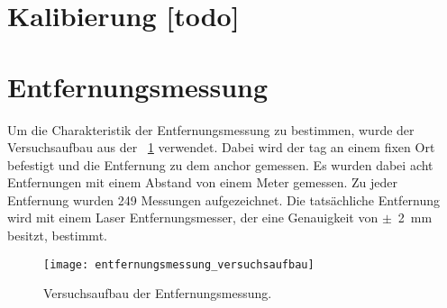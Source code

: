 \section{Kalibierung [todo]}


\begin{comment}
--------------------------------------------------------------------------------
- Mit welchen Einstellungen kommt man auf die Entfernungsmessung?
- Streuung?
- LOS/NLOS {Holz, Bücher, Menschlicher Körper}
	- Welcher Fehler ergibt zwischen LOS/NLOS?
- Wie verändert sich die Genauigkeit der Entfernungsmessung bei einer direkten Sichtverbindung (engl. Line--of--sight (LOS)) und indirekten Sichtverbindung (engl. Non--line--of--sight (NLOS))?
- isaacs2009optimal - Optimal sensor placement for time difference of arrival localization
- Diagramme
	- \cite{kurth2003experimental}
		- Fig. 2: Sample PDFs showing the true ranges associated with 20, 30, and 50 ft measured ranges. (X: true range, Y:count)
		- Fig. 3: The mean true distances to RF tags vs. measured distances (X:measured range, Y: true range)
		- Fig. 4: The variance in true distances to RF tags vs. measured distances (X:measured range (ft), Y: variance (ft^2))
	
- https://matheguru.com/stochastik/standardfehler.html
- https://de.wikipedia.org/wiki/Standardfehler
	
\end{comment}
\section{Entfernungsmessung}

Um die Charakteristik der Entfernungsmessung zu bestimmen, wurde der Versuchsaufbau aus der \figurename~\ref{fig:entfernungsmessung_versuchsaufbau} verwendet. Dabei wird der \Gls{tag} an einem fixen Ort befestigt und die Entfernung zu dem \Gls{anchor} gemessen. Es wurden dabei acht Entfernungen mit einem Abstand von einem Meter gemessen. Zu jeder Entfernung wurden \num{249} Messungen aufgezeichnet. Die tatsächliche Entfernung wird mit einem Laser Entfernungsmesser, der eine Genauigkeit von $\pm$~\SI{2}{\milli\meter} besitzt, bestimmt.

\begin{figure}[ht!]
  \centering
  \texttt{[image: entfernungsmessung\_versuchsaufbau]}
	\caption{Versuchsaufbau der Entfernungsmessung.}
	\label{fig:entfernungsmessung_versuchsaufbau}
\end{figure}

